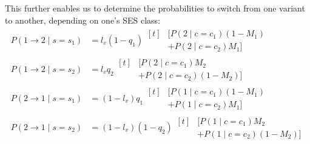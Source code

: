 \documentclass[../thesis.tex]{subfiles}
\begin{document}
This further enables us to determine the probabilities to switch from one variant to
another, depending on one's \ac{SES} class:
\begin{equation}
  \label{eq:final_trans_probs}
  \begin{aligned}
      P(1 \rightarrow 2 \mid s = s_1)
          &= l_v (1 - q_1)
          \begin{aligned}[t]
            &[P(2 \mid c = c_1) (1 - M_1)
            \\
            &+ P(2 \mid c = c_2) M_1]
          \end{aligned}
      \\[1ex]
      P(1 \rightarrow 2 \mid s = s_2)
          &= l_v q_2
          \begin{aligned}[t]
              &[P(2 \mid c = c_1) M_2
              \\
              &+ P(2 \mid c = c_2)(1 - M_2)]
          \end{aligned}
      \\[1ex]
      P(2 \rightarrow 1 \mid s = s_1)
          &= (1 - l_v) q_1
          \begin{aligned}[t]
              &[P(1 \mid c = c_1) (1 - M_1)
              \\
              & + P(1 \mid c = c_2) M_1]
          \end{aligned}
      \\[1ex]
      P(2 \rightarrow 1 \mid s = s_2)
          &= (1 - l_v) (1 - q_2)
          \begin{aligned}[t]
              &[P(1 \mid c = c_1) M_2
              \\
              &+ P(1 \mid c = c_2) (1 - M_2)]
          \end{aligned}
  \end{aligned}
\end{equation}
\end{document}
